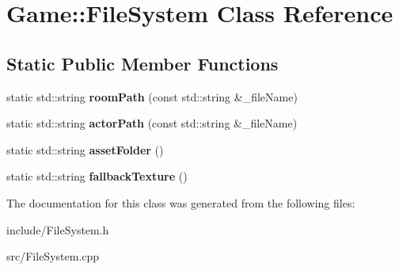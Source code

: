 \hypertarget{classGame_1_1FileSystem}{\section{Game\-:\-:File\-System Class Reference}
\label{classGame_1_1FileSystem}
}
\subsection*{Static Public Member Functions}
\begin{DoxyCompactItemize}
\item 
\hypertarget{classGame_1_1FileSystem_a6b3eadb4bbe877108eed1448541912b5}{static std\-::string {\bfseries room\-Path} (const std\-::string \&\-\_\-file\-Name)}\label{classGame_1_1FileSystem_a6b3eadb4bbe877108eed1448541912b5}

\item 
\hypertarget{classGame_1_1FileSystem_a8fdea3ab15f56e2a2f76288ad2b2d96e}{static std\-::string {\bfseries actor\-Path} (const std\-::string \&\-\_\-file\-Name)}\label{classGame_1_1FileSystem_a8fdea3ab15f56e2a2f76288ad2b2d96e}

\item 
\hypertarget{classGame_1_1FileSystem_a074e7f5d23c899e163125388a7b56963}{static std\-::string {\bfseries asset\-Folder} ()}\label{classGame_1_1FileSystem_a074e7f5d23c899e163125388a7b56963}

\item 
\hypertarget{classGame_1_1FileSystem_ac634178ad95740f9b229629d67c30f5b}{static std\-::string {\bfseries fallback\-Texture} ()}\label{classGame_1_1FileSystem_ac634178ad95740f9b229629d67c30f5b}

\end{DoxyCompactItemize}


The documentation for this class was generated from the following files\-:\begin{DoxyCompactItemize}
\item 
include/File\-System.\-h\item 
src/File\-System.\-cpp\end{DoxyCompactItemize}
